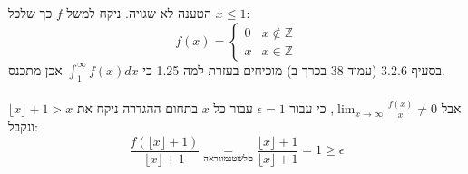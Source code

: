 \documentclass{article}
\newcommand\underrel[2]{\mathrel{\mathop{#2}\limits_{#1}}}
\begin{document}
הטענה לא שגויה. ניקח למשל $f$ כך שלכל $x\leq 1$:
\[
    f(x) = \begin{cases}
        0 & x\notin \mathbb{Z} \\
        x & x\in \mathbb{Z}
    \end{cases}
\]
בסעיף 3.2.6 (עמוד 38 בכרך ב)
מוכיחים בעזרת למה 1.25 כי $\int_1^\infty f(x)dx$
אכן מתכנס.
\\\\
אבל $\lim_{x\rightarrow\infty}\frac{f(x)}{x}\ne 0$,
כי עבור $\epsilon=1$ עבור כל $x$ בתחום ההגדרה ניקח את $\lfloor x \rfloor + 1 > x$ ונקבל:
\[
    \frac{f(\lfloor x \rfloor + 1)}{\lfloor x \rfloor + 1} \underrel{הארגומנט שלם}{=}
    \frac{\lfloor x \rfloor + 1}{\lfloor x \rfloor + 1} =
    1 \geq \epsilon
\]
\end{document}
